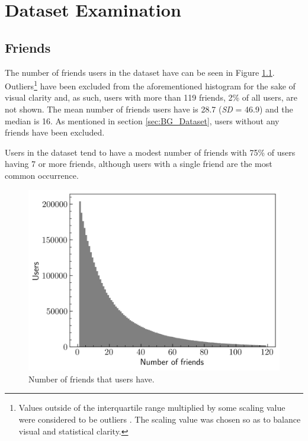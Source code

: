 \chapter{Dataset Examination} \label{sec:Dataset}

\section{Friends} \label{sec:Dataset_Friends}

The number of friends users in the dataset have can be seen in Figure \ref{fig:Dataset_HistFriends}. Outliers\footnote[2]{Values outside of the interquartile range multiplied by some scaling value were considered to be outliers \cite{Seo2006_Outliers}. The scaling value was chosen so as to balance visual and statistical clarity.} have been excluded from the aforementioned histogram for the sake of visual clarity and, as such, users with more than 119 friends, 2\% of all users, are not shown. The mean number of friends users have is 28.7 (\textit{SD} = 46.9) and the median is 16. As mentioned in section \ref{sec:BG_Dataset}, users without any friends have been excluded.

Users in the dataset tend to have a modest number of friends with 75\% of users having 7 or more friends, although users with a single friend are the most common occurrence.

\begin{figure}[ht]
    \centering
    \includegraphics[scale=0.55]{figures/03_dataset/01_hist_friends.png}
    \caption{Number of friends that users have.}
    \label{fig:Dataset_HistFriends}
\end{figure}

